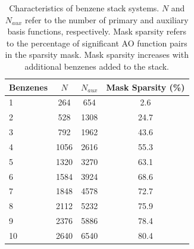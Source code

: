 \begingroup
\begin{table}[H]
\centering
\renewcommand{\baselinestretch}{1}
\caption{Characteristics of benzene stack systems. $N$ and $N_{aux}$ refer to the number of primary and auxiliary basis functions, respectively.
 Mask sparsity refers to the percentage of significant AO function pairs in the sparsity mask. Mask sparsity increases with additional benzenes added to the stack.}
\begin{tabular}{l ccc}
\multicolumn{1}{l}{\textbf{Benzenes}} &
\multicolumn{1}{c}{\textbf{$N$}} &
\multicolumn{1}{c}{\textbf{$N_{aux}$}} &
\multicolumn{1}{c}{\textbf{Mask Sparsity (\%)}} \\
\hline
1        & 264  & 654       & 2.6              \\ 
2        & 528  & 1308      & 24.7             \\ 
3        & 792  & 1962      & 43.6             \\ 
4        & 1056 & 2616      & 55.3             \\ 
5        & 1320 & 3270      & 63.1             \\ 
6        & 1584 & 3924      & 68.6             \\ 
7        & 1848 & 4578      & 72.7             \\ 
8        & 2112 & 5232      & 75.9             \\ 
9        & 2376 & 5886      & 78.4             \\ 
10       & 2640 & 6540      & 80.4             \\ 
\end{tabular}
\end{table}
\endgroup

